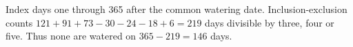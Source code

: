 Index days one through 365 after the common watering date. Inclusion-exclusion counts $121+91+73-30-24-18+6=219$ days divisible by three, four or five. Thus none are watered on $365-219=\boxed{146}$ days.
